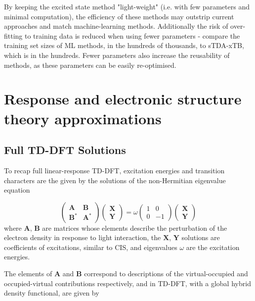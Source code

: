 By keeping the excited state method "light-weight" (i.e. with few parameters and 
minimal computation), the efficiency of these methods may outstrip current approaches 
and match machine-learning methods. Additionally the risk of over-fitting to training 
data is reduced when using fewer parameters - compare the training set sizes of ML
methods, in the hundreds of thousands, to sTDA-xTB, which is in the hundreds. Fewer
parameters also increase the reusability of methods, as these parameters can be easily
re-optimised.

\section{Response and electronic structure theory approximations}
\label{sec:theory}

\subsection{Full TD-DFT Solutions}
\label{subsec:tddft_equation}
To recap full linear-response TD-DFT, excitation energies and transition characters 
are the given by the solutions of the non-Hermitian eigenvalue equation

\begin{equation}
    \begin{pmatrix}
        \mathbf{A}   & \mathbf{B} \\
        \mathbf{B}^\ast  & \mathbf{A}^\ast
    \end{pmatrix}
    \begin{pmatrix}
        \mathbf{X} \\
        \mathbf{Y}
    \end{pmatrix}
    = 
    \omega
    \begin{pmatrix}
        1 & 0 \\
        0 & -1
    \end{pmatrix}
    \begin{pmatrix}
        \mathbf{X} \\
        \mathbf{Y}
    \end{pmatrix}
\end{equation}
%
where $\mathbf{A}$, $\mathbf{B}$ are matrices whose elements describe the perturbation
of the electron density in response to light interaction, the $\mathbf{X}$, $\mathbf{Y}$
solutions are coefficients of excitations, similar to CIS, and eigenvalues $\omega$
are the excitation energies.

The elements of $\mathbf{A}$ and $\mathbf{B}$ correspond to descriptions of the
virtual-occupied and occupied-virtual contributions respectively, and in TD-DFT, 
with a global hybrid density functional, are given by

